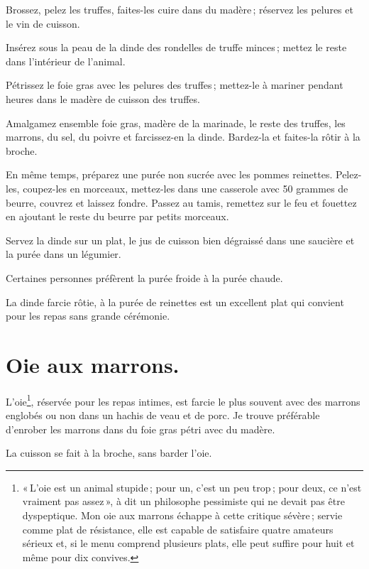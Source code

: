 Brossez, pelez les truffes, faites-les cuire dans du madère ; réservez les
pelures et le vin de cuisson.

Insérez sous la peau de la dinde des rondelles de truffe minces ; mettez le
reste dans l'intérieur de l'animal.

Pétrissez le foie gras avec les pelures des truffes ; mettez-le à mariner
pendant {\mmm} heures dans le madère de cuisson des truffes.

Amalgamez ensemble foie gras, madère de la marinade, le reste des truffes, les
marrons, du sel, du poivre et farcissez-en la dinde. Bardez-la et faites-la
rôtir à la broche.

En même temps, préparez une purée non sucrée avec les pommes reinettes.
Pelez-les, coupez-les en morceaux, mettez-les dans une casserole avec 50
grammes de beurre, couvrez et laissez fondre. Passez au tamis, remettez sur le
feu et fouettez en ajoutant le reste du beurre par petits morceaux.

Servez la dinde sur un plat, le jus de cuisson bien dégraissé dans une saucière
et la purée dans un légumier.

Certaines personnes préfèrent la purée froide à la purée chaude.

La dinde farcie rôtie, à la purée de reinettes est un excellent plat qui convient
pour les repas sans grande cérémonie.

\section*{\centering Oie aux marrons.}
{}

L'oie\footnote{« L'oie est un animal stupide ; pour un, c'est un peu trop ;
pour deux, ce n'est vraiment pas assez », à dit un philosophe pessimiste qui ne
devait pas être dyspeptique. Mon oie aux marrons échappe à cette critique
sévère ; servie comme plat de résistance, elle est capable de satisfaire quatre
amateurs sérieux et, si le menu comprend plusieurs plats, elle peut suffire
pour huit et même pour dix convives.}, réservée pour les repas intimes, est
farcie le plus souvent avec des marrons englobés ou non dans un hachis de veau
et de porc. Je trouve préférable d'enrober les marrons dans du foie gras pétri
avec du madère.

La cuisson se fait à la broche, sans barder l'oie.

